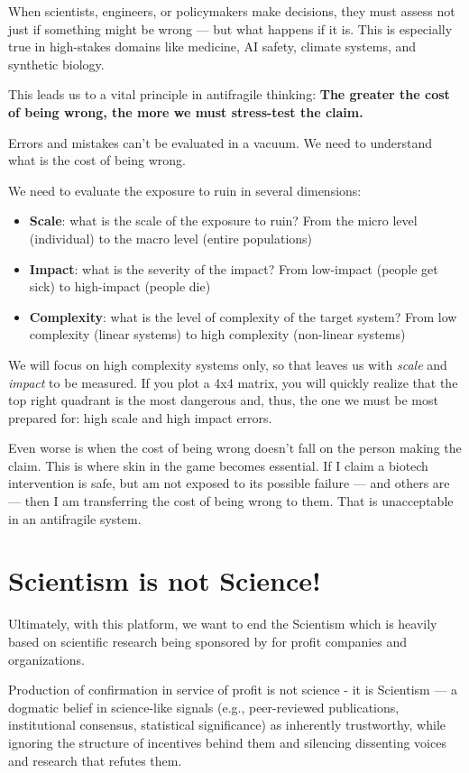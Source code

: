 \documentclass{article}
\begin{document}
When scientists, engineers, or policymakers make decisions, they must assess not just if something might be wrong — but what happens if it is. This is especially true in high-stakes domains like medicine, AI safety, climate systems, and synthetic biology.

This leads us to a vital principle in antifragile thinking: \textbf{The greater the cost of being wrong, the more we must stress-test the claim.}

Errors and mistakes can't be evaluated in a vacuum. We need to understand what is the cost of being wrong. 

We need to evaluate the exposure to ruin in several dimensions:

\begin{itemize}
	\item \textbf{Scale}: what is the scale of the exposure to ruin? From the micro level (individual) to the macro level (entire populations)
	\item \textbf{Impact}: what is the severity of the impact? From low-impact (people get sick) to high-impact (people die)
	\item \textbf{Complexity}: what is the level of complexity of the target system? From low complexity (linear systems) to high complexity (non-linear systems)
\end{itemize}

We will focus on high complexity systems only, so that leaves us with \textit{scale} and \textit{impact} to be measured.
If you plot a 4x4 matrix, you will quickly realize that the top right quadrant is the most dangerous and, thus, the one we must be most prepared for: high scale and high impact errors.

Even worse is when the cost of being wrong doesn't fall on the person making the claim. This is where skin in the game becomes essential. If I claim a biotech intervention is safe, but am not exposed to its possible failure — and others are — then I am transferring the cost of being wrong to them. That is unacceptable in an antifragile system.

\section{Scientism is not Science!}
Ultimately, with this platform, we want to end the Scientism which is heavily based on scientific research being sponsored by for profit companies and organizations.

Production of confirmation in service of profit is not science - it is Scientism — a dogmatic belief in science-like signals (e.g., peer-reviewed publications, institutional consensus, statistical significance) as inherently trustworthy, while ignoring the structure of incentives behind them and silencing dissenting voices and research that refutes them.
\end{document}
